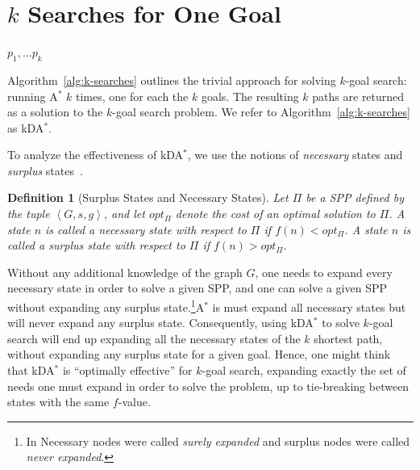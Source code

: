 \documentclass{aicom2e}
\newtheorem{definition}{Definition}
\newcommand{\kgs}{$k$-goal search}
\newcommand{\astar}{A$^*$}
\newcommand{\kxastar}{kDA$^*$}
\newcommand{\tuple}[1]{\ensuremath{\left \langle #1 \right \rangle }}
\newcommand{\roni}[1]{\textbf{[RS:#1]}}
\begin{document}
\section{$k$ Searches for One Goal}
\label{sec:k-one-goal}
\begin{algorithm2e}[t!]
    \small
    \For{$i$=1 to $k$}{
        $p_i\gets$ \astar{}($s$,$g_i$)\\
    }
    \Return $p_1,\ldots p_k$\\
    \caption{\kxastar{}: \kgs{} with $k$ \astar{}s}
    \label{alg:k-searches}
\end{algorithm2e}




Algorithm~\ref{alg:k-searches} outlines the trivial approach for solving
\kgs{}: running \astar{} $k$ times, one for each the $k$ goals. The resulting
$k$ paths are returned as a solution to the \kgs{} problem. We refer to
Algorithm~\ref{alg:k-searches} as \kxastar{}.


To analyze the effectiveness of \kxastar{}, we use the notions of {\em
necessary} states and {\em surplus} states~\cite{goldenberg2014enhanced}.

\begin{definition}[Surplus States and Necessary States]
    Let $\Pi$ be a SPP defined by the tuple $\tuple{G,s,g}$, and let $opt_\Pi$ denote the cost of an optimal solution to $\Pi$.
    A state $n$ is called a {\em necessary} state with respect to $\Pi$ if $f(n)<opt_\Pi$.
    A state $n$ is called a {\em surplus} state with respect to $\Pi$ if $f(n)>opt_\Pi$.
\label{def:surplus}
\end{definition}
Without any additional knowledge of the graph $G$, one needs to expand every
necessary state in order to solve a given SPP, and one can solve a given SPP
without expanding any surplus state.\footnote{In \cite{Dechter} Necessary nodes
were called {\em surely expanded} and surplus nodes were called {\em never
expanded}.}\astar{} is must expand all necessary states but will never expand
any surplus state. Consequently, using \kxastar{} to solve \kgs{} will end up
expanding all the necessary states of the $k$ shortest path, without expanding
any surplus state for a given goal. Hence, one might think that \kxastar{} is
``optimally effective'' for \kgs{}, expanding exactly the set of needs one must
expand in order to solve the problem, up to tie-breaking between states with
the same $f$-value.
\end{document}
